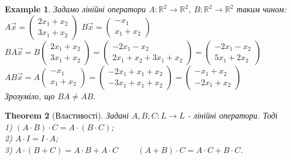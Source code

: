 \documentclass[a4paper, 10pt]{article}
\theoremstyle{theoremdd}
\newtheorem{theorem}{Theorem}[subsection]
\theoremstyle{theoremdd}
\theoremstyle{theoremdd}
\theoremstyle{theoremdd}
\newtheorem{example}[theorem]{Example}
\theoremstyle{theoremdd}
\theoremstyle{theoremdd}
\theoremstyle{theoremdd}
\theoremstyle{theoremdd}
\begin{document}
	\begin{example}
	Задамо лінійні оператори $A: \mathbb{R}^2 \to \mathbb{R}^2$, $B: \mathbb{R}^2 \to \mathbb{R}^2$ таким чином:\\
	$A \vec{x} = \begin{pmatrix}
	2x_1 + x_2 \\ 3x_1 + x_2
	\end{pmatrix}$ \hspace{1cm} $B \vec{x} = \begin{pmatrix}
	-x_1 \\ x_1 + x_2
	\end{pmatrix}$\\
	$BA \vec{x} = B \begin{pmatrix}
	2x_1 + x_2 \\ 3x_1 + x_2
	\end{pmatrix} = \begin{pmatrix}
	-2x_1-x_2 \\ 2x_1+x_2+3x_1+x_2
	\end{pmatrix} = \begin{pmatrix}
	-2x_1-x_2 \\ 5x_1+2x_2
	\end{pmatrix}$\\
	$AB \vec{x} = A \begin{pmatrix}
	-x_1 \\ x_1 + x_2
	\end{pmatrix} = \begin{pmatrix}
	-2x_1 + x_1 + x_2 \\ -3x_1 + x_1 + x_2
	\end{pmatrix} = \begin{pmatrix}
	-x_1 + x_2 \\ -2x_1 + x_2
	\end{pmatrix}$\\
	Зрозуміло, що $BA \neq AB$.
	\end{example}
	
	\begin{theorem}[Властивості]
	Задані $A,B,C: L \to L$ - лінійні оператори. Тоді\\
	1) $(A \cdot B) \cdot C = A \cdot (B \cdot C)$;\\
	2) $A \cdot I = I \cdot A$;\\
	3) $A \cdot (B+C) = A \cdot B + A \cdot C \hspace{1cm} (A+B) \cdot C = A \cdot C + B \cdot C$.
	\end{theorem}
	
\end{document}
